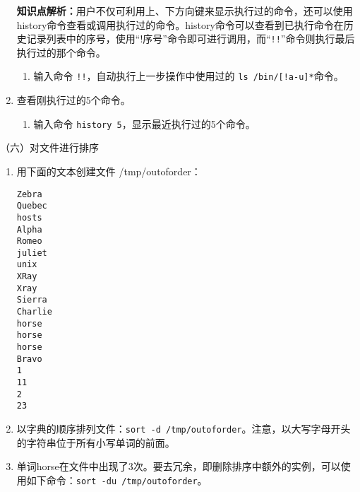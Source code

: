 \begin{enumerate}
    \textbf{知识点解析：}用户不仅可利用上、下方向键来显示执行过的命令，还可以使用history命令查看或调用执行过的命令。history命令可以查看到已执行命令在历史记录列表中的序号，使用“!序号”命令即可进行调用，而“\verb|!!|”命令则执行最后执行过的那个命令。
    \begin{enumerate}
      \item 输入命令 \verb|!!|，自动执行上一步操作中使用过的 \verb|ls /bin/[!a-u]*|命令。
    \end{enumerate}
  \item 查看刚执行过的5个命令。
    \begin{enumerate}
      \item 输入命令 \verb|history 5|，显示最近执行过的5个命令。
    \end{enumerate}
\end{enumerate}

\vspace{0.1in}
（六）对文件进行排序
\begin{enumerate}
  \item 用下面的文本创建文件 /tmp/outoforder：
\begin{verbatim}
Zebra
Quebec
hosts
Alpha
Romeo
juliet
unix
XRay
Xray
Sierra
Charlie
horse
horse
horse
Bravo
1
11
2
23
\end{verbatim}
  \item 以字典的顺序排列文件：\verb|sort -d /tmp/outoforder|。注意，以大写字母开头的字符串位于所有小写单词的前面。
  \item 单词horse在文件中出现了3次。要去冗余，即删除排序中额外的实例，可以使用如下命令：\verb|sort -du /tmp/outoforder|。
\end{enumerate}


